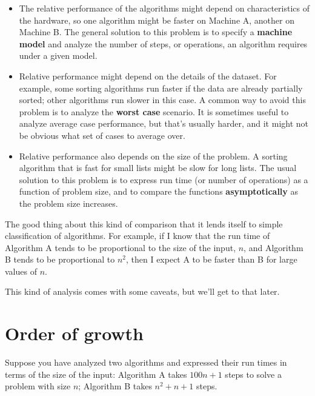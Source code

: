 \documentclass[10pt]{book}
\begin{document}
\begin{itemize}

\item The relative performance of the algorithms might
depend on characteristics of the hardware, so one algorithm
might be faster on Machine A, another on Machine B.
The general solution to this problem is to specify a
{\bf machine model} and analyze the number of steps, or
operations, an algorithm requires under a given model.

\item Relative performance might depend on the details of
the dataset.  For example, some sorting
algorithms run faster if the data are already partially sorted;
other algorithms run slower in this case.
A common way to avoid this problem is to analyze the
{\bf worst case} scenario.  It is sometimes useful to
analyze average case performance, but that's usually harder,
and it might not be obvious what set of cases to average over.

\item Relative performance also depends on the size of the
problem.  A sorting algorithm that is fast for small lists
might be slow for long lists.
The usual solution to this problem is to express run time
(or number of operations) as a function of problem size,
and to compare the functions {\bf asymptotically} as the problem
size increases.

\end{itemize}

The good thing about this kind of comparison that it lends
itself to simple classification of algorithms.  For example,
if I know that the run time of Algorithm A tends to be
proportional to the size of the input, $n$, and Algorithm B
tends to be proportional to $n^2$, then I
expect A to be faster than B for large values of $n$.

This kind of analysis comes with some caveats, but we'll get
to that later.


\section{Order of growth}

Suppose you have analyzed two algorithms and expressed
their run times in terms of the size of the input:
Algorithm A takes $100n+1$ steps to solve a problem with
size $n$; Algorithm B takes $n^2 + n + 1$ steps.
\end{document}

